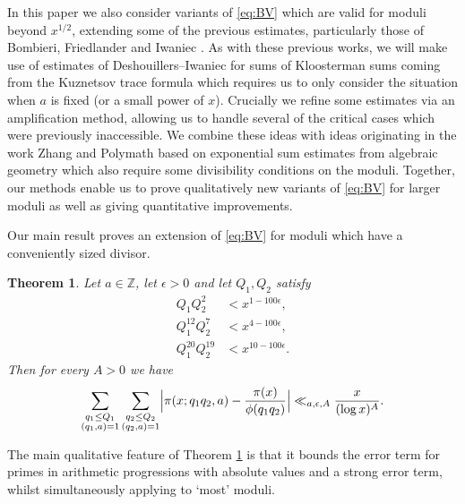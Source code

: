 \documentclass[10pt]{amsart}
\theoremstyle{plain}
\newtheorem{thrm}{Theorem}[section]
\numberwithin{equation}{section}
\begin{document}
In this paper we also consider variants of \eqref{eq:BV} which are valid for moduli beyond $x^{1/2}$, extending some of the previous estimates, particularly those of Bombieri, Friedlander and Iwaniec \cite{BFI1,BFI2,BFI3}. As with these previous works, we will make use of estimates of Deshouillers--Iwaniec \cite{DeshouillersIwaniec} for sums of Kloosterman sums coming from the Kuznetsov trace formula which requires us to only consider the situation when $a$ is fixed (or a small power of $x$). Crucially we refine some estimates via an amplification method, allowing us to handle several of the critical cases which were previously inaccessible. We combine these ideas with ideas originating in the work  Zhang \cite{Zhang} and Polymath \cite{Polymath} based on exponential sum estimates from algebraic geometry which also require some divisibility conditions on the moduli. Together, our methods enable us to prove qualitatively new variants of \eqref{eq:BV} for larger moduli as well as giving quantitative improvements.

Our main result proves an extension of \eqref{eq:BV} for moduli which have a conveniently sized divisor.
%
%
%
%
%
%
%
%
\begin{thrm}\label{thrm:MainTheorem}
Let $a\in\mathbb{Z}$, let $\epsilon>0$ and let $Q_1,Q_2$ satisfy
\begin{align}
Q_1Q_2^2&<x^{1-100\epsilon},\label{eq:Cons1}\\
Q_1^{12}Q_2^7&<x^{4-100\epsilon},\label{eq:Cons2}\\
Q_1^{20}Q_2^{19}&<x^{10-100\epsilon}.\label{eq:Cons3}
\end{align}
Then for every  $A>0$ we have
\[
\sum_{\substack{q_1\le  Q_1\\ (q_1,a)=1}}\sum_{\substack{q_2\le  Q_2\\ (q_2,a)=1}}\Bigl|\pi(x;q_1q_2,a)-\frac{\pi(x)}{\phi(q_1q_2)}\Bigr|\ll_{a,\epsilon,A}\frac{x}{(\log{x})^A}.
\]
\end{thrm}
%
%
%
%
%
%
%
%
The main qualitative feature of Theorem \ref{thrm:MainTheorem} is that it bounds the error term for primes in arithmetic progressions with absolute values and a strong error term, whilst simultaneously applying to `most' moduli.
\end{document}
